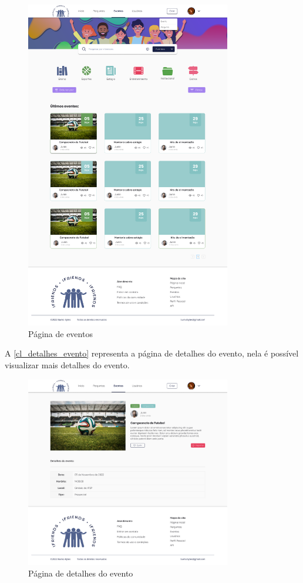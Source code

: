 \begin{figure}[htb]
\centering
\caption{\label{cl_eventos} Página de eventos}
\includegraphics[width=0.8\textwidth]{anexos/Imagens_Prototipo/com_login/eventos.png}
\end{figure}
\FloatBarrier

A \autoref{cl_detalhes_evento} representa a página de detalhes do evento, nela é possível visualizar mais detalhes do evento.

\begin{figure}[htb]
\centering
\caption{\label{cl_detalhes_evento} Página de detalhes do evento}
\includegraphics[width=0.8\textwidth]{anexos/Imagens_Prototipo/com_login/detalhes_eventos.png}
\end{figure}
\FloatBarrier

